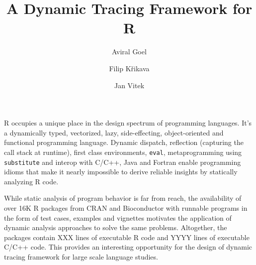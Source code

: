 \documentclass[acmsmall,review]{acmart}
\title{A Dynamic Tracing Framework for R}
\author{Aviral Goel}
\affiliation{
  \institution{Northeastern University}
  \country{USA}
}
\author{Filip Křikava}
\affiliation{
  \institution{Czech Technical University}
  \country{Czechia}
}
\author{Jan Vitek}
\affiliation{
  \institution{Northeastern University}
  \country{USA}
}
\affiliation{
  \institution{Czech Technical University}
  \country{Czechia}
}
\newcommand{\code}[1]{\lstinline|#1|\xspace}
\begin{document}
\maketitle

R occupies a unique place in the design spectrum of programming languages. It’s
a dynamically typed, vectorized, lazy, side-effecting, object-oriented and
functional programming language. Dynamic dispatch, reflection (capturing the
call stack at runtime), first class environments, \code{eval}, metaprogramming
using \code{substitute} and interop with C/C++, Java and Fortran enable programming
idioms that make it nearly impossible to derive reliable insights by
statically analyzing R code.

While static analysis of program behavior is far from reach, the availability of
over 16K R packages from CRAN and Bioconductor with runnable programs in the
form of test cases, examples and vignettes motivates the application of dynamic
analysis approaches to solve the same problems. Altogether, the packages contain
XXX lines of executable R code and YYYY lines of executable C/C++ code. This
provides an interesting opportunity for the design of dynamic tracing framework
for large scale language studies.
\end{document}
